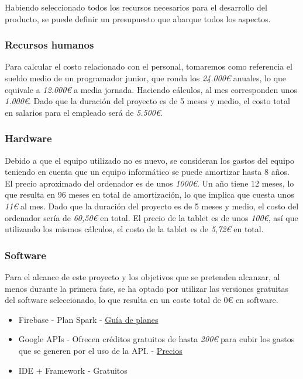 \documentclass[a4paper, 12pt]{article}
\begin{document}
Habiendo seleccionado todos los recursos necesarios para el desarrollo del producto, se puede definir un presupuesto que abarque todos los aspectos.

\subsubsection{Recursos humanos}

Para calcular el costo relacionado con el personal, tomaremos como referencia el sueldo medio de un programador junior, que ronda los \textit{24.000€} anuales, lo que equivale a \textit{12.000€} a media jornada. Haciendo cálculos, al mes corresponden unos \textit{1.000€}. Dado que la duración del proyecto es de 5 meses y medio, el costo total en salarios para el empleado será de \textit{5.500€}.

\subsubsection{Hardware}

Debido a que el equipo utilizado no es nuevo, se consideran los gastos del equipo teniendo en cuenta que un equipo informático se puede amortizar hasta 8 años. El precio aproximado del ordenador es de unos \textit{1000€}. Un año tiene 12 meses, lo que resulta en 96 meses en total de amortización, lo que implica que cuesta unos \textit{11€} al mes. Dado que la duración del proyecto es de 5 meses y medio, el costo del ordenador sería de \textit{60,50€} en total. El precio de la tablet es de unos \textit{100€}, así que utilizando los mismos cálculos, el costo de la tablet es de \textit{5,72€} en total.

\subsubsection{Software}

Para el alcance de este proyecto y los objetivos que se pretenden alcanzar, al menos durante la primera fase, se ha optado por utilizar las versiones gratuitas del software seleccionado, lo que resulta en un coste total de 0€ en software.

\begin{itemize}[noitemsep]
	\item Firebase - Plan Spark - \href{https://firebase.google.com/pricing?hl=es-419}{Guía de planes} \cite{firebase_plans}
	\item Google APIs - Ofrecen créditos gratuitos de hasta \textit{200€} para cubir los gastos que se generen por el uso de la API. - \href{https://mapsplatform.google.com/intl/es/pricing/}{Precios}\cite{google_prices}
	\item IDE + Framework - Gratuitos
\end{itemize}
\end{document}
